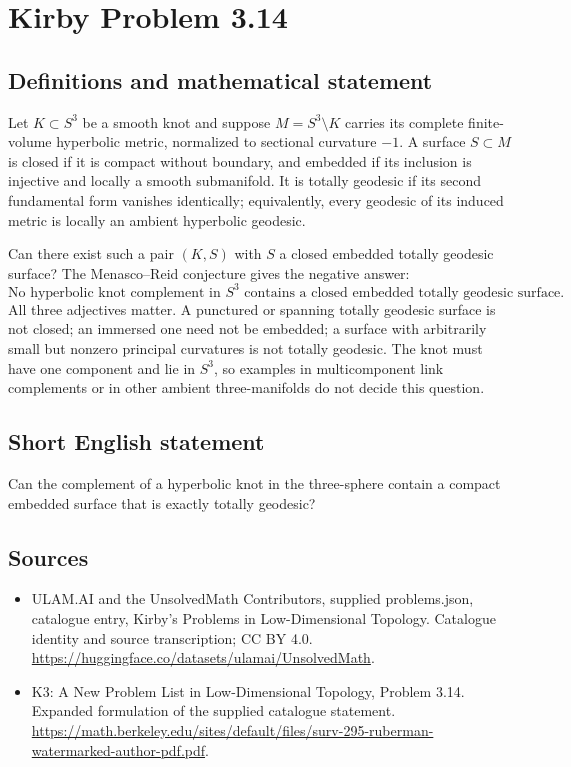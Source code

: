 \documentclass[11pt,a4paper]{article}
\begin{document}
\section*{Kirby Problem 3.14}\label{statement}

\subsection{Definitions and mathematical statement}
Let $K\subset S^3$ be a smooth knot and suppose $M=S^3\setminus K$ carries
its complete finite-volume hyperbolic metric, normalized to sectional curvature
$-1$. A surface $S\subset M$ is closed if it is compact without boundary,
and embedded if its inclusion is injective and locally a smooth submanifold.
It is totally geodesic if its second fundamental form vanishes identically;
equivalently, every geodesic of its induced metric is locally an ambient
hyperbolic geodesic.

Can there exist such a pair $(K,S)$ with $S$ a closed embedded totally
geodesic surface? The Menasco--Reid conjecture gives the negative answer:
\[
 \text{No hyperbolic knot complement in }S^3\text{ contains a closed
 embedded totally geodesic surface.}
\]
All three adjectives matter. A punctured or spanning totally geodesic surface
is not closed; an immersed one need not be embedded; a surface with arbitrarily
small but nonzero principal curvatures is not totally geodesic. The knot must
have one component and lie in $S^3$, so examples in multicomponent link
complements or in other ambient three-manifolds do not decide this question.
\subsection{Short English statement}
Can the complement of a hyperbolic knot in the three-sphere contain a compact embedded surface that is exactly totally geodesic?
\subsection{Sources}
\begin{itemize}
\item[S1] ULAM.AI and the UnsolvedMath Contributors, supplied problems.json, catalogue entry, Kirby's Problems in Low-Dimensional Topology. Catalogue identity and source transcription; CC BY 4.0.
\url{https://huggingface.co/datasets/ulamai/UnsolvedMath}.
\item[S2] K3: A New Problem List in Low-Dimensional Topology, Problem 3.14. Expanded formulation of the supplied catalogue statement.
\url{https://math.berkeley.edu/sites/default/files/surv-295-ruberman-watermarked-author-pdf.pdf}.
\end{itemize}
\end{document}
